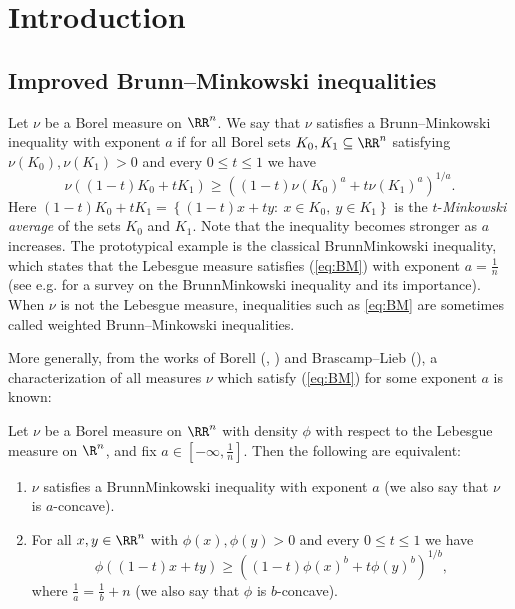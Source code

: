 \section{Introduction}

\subsection{Improved Brunn--Minkowski inequalities}
Let $\nu$ be a Borel measure on $\RR^{n}$. We say that $\nu$ satisfies
a Brunn--Minkowski inequality with exponent $a$ if for
all Borel sets $K_{0}, K_{1} \subseteq\RR^{n}$ satisfying $\nu(K_{0}),\nu(K_{1})>0$ and
every $0\le t \le1$ we have
\begin{equation} \label{eq:BM}
\nu\left((1-t)K_{0}+ t K_{1}\right)\ge\left((1-t)\nu(K_{0})^{a}+ t \nu(K_{1})^{a}\right)^{1/a}.
\end{equation}
Here $(1-t)K_{0} +t K_{1}=\left\{ (1-t) x+ t  y:\ x\in K_{0},\ y\in K_{1}\right\} $ is the $t$-\emph{Minkowski average} of the sets $K_{0}$ and $K_{1}$. Note that the inequality becomes stronger as $a$ increases. The prototypical
example is the classical Brunn\textendash Minkowski inequality, which
states that the Lebesgue measure satisfies (\eqref{eq:BM}) with exponent
$a=\frac{1}{n}$ (see e.g. \cite{Gardner02} for a survey on the
Brunn\textendash Minkowski inequality and its importance). When $\nu$ is not the Lebesgue measure, inequalities such as \eqref{eq:BM} are sometimes called weighted Brunn--Minkowski inequalities.

More generally, from the works of Borell (\cite{Borell74}, \cite{Borell75}) and Brascamp--Lieb (\cite{BrascampLieb76BBL}), a characterization of all measures $\nu$ which satisfy (\eqref{eq:BM}) for some exponent
$a$ is known: 
\begin{thm} \label{thm: Borell}
Let $\nu$ be a Borel measure on $\RR^{n}$ with density $\phi$ with
respect to the Lebesgue measure on $\R^n$, and fix $a\in[-\infty,\frac{1}{n}]$.
Then the following are equivalent: 
\begin{enumerate}
\item $\nu$ satisfies a Brunn\textendash Minkowski inequality with exponent
$a$ (we also say that $\nu$ is $a$-concave). 
\item For all $x,y\in\RR^{n}$ with $\phi(x),\phi(y)>0$ and every $0\le t \le1$
we have 
\begin{equation}
\phi\left(\left(1-t\right)x+t y\right)\ge\left((1-t)\phi(x)^{b}+t\phi(y)^{b}\right)^{1/b},
\end{equation}
 where $\frac{1}{a}=\frac{1}{b}+n$ (we also say that $\phi$ is $b$-concave). 
\end{enumerate}
\end{thm}

